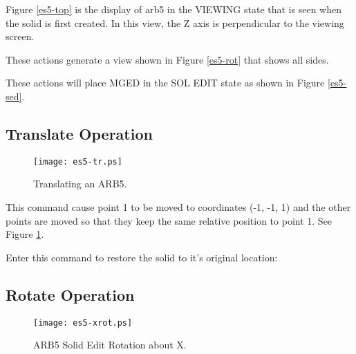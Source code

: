 Figure \ref{es5-top} is the display of arb5
in the VIEWING state that is seen when
the solid is first created.
In this view, the Z axis is perpendicular to the viewing screen.


These actions generate a view shown in Figure \ref{es5-rot}
that shows all sides.


These actions will place MGED in the SOL EDIT state
as shown in Figure \ref{es5-sed}.

\subsection{Translate Operation}

\begin{figure}
\centering \texttt{[image: es5-tr.ps]}
\caption{Translating an ARB5.}
\label{es5-tr}
\end{figure}


This command cause point 1 to be moved to coordinates (-1, -1, 1) and the
other points are moved so that they keep the same relative position to point
1.  See Figure \ref{es5-tr}.

Enter this command to restore the solid to it's original location:


\subsection{Rotate Operation}

\begin{figure}
\centering \texttt{[image: es5-xrot.ps]}
\caption{ARB5 Solid Edit Rotation about X.}
\label{es5-xrot}
\end{figure}

